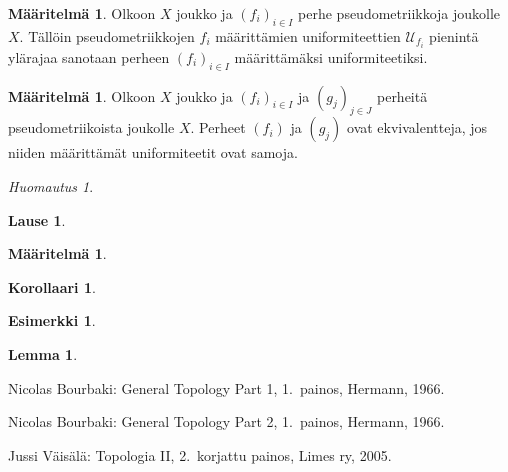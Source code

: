 \documentclass[12pt,a4paper,leqno]{report}
\newcommand{\R}{\mathbb{R}}
\newcommand{\U}{\mathcal{U}}
\theoremstyle{plain}
\newtheorem{lause}[equation]{Lause}
\newtheorem{lem}[equation]{Lemma}
\newtheorem{kor}[equation]{Korollaari}
\theoremstyle{definition}
\newtheorem{maar}[equation]{Määritelmä}
\newtheorem{esim}[equation]{Esimerkki}
\theoremstyle{remark}
\newtheorem{huom}[equation]{Huomautus}
\begin{document}
\begin{maar}
Olkoon $X$ joukko ja $(f_i)_{i\in I} $ perhe pseudometriikkoja joukolle $X$. 
Tällöin pseudometriikkojen $f_i$ määrittämien uniformiteettien $\U_{f_i}$ pienintä ylärajaa sanotaan perheen $(f_i)_{i\in I}$ määrittämäksi uniformiteetiksi. 
\end{maar}
\begin{maar}
Olkoon $X$ joukko ja $(f_i)_{i\in I} $ ja $(g_j)_{j\in J} $ perheitä pseudometriikoista joukolle $X$. 
Perheet $(f_i)$ ja $(g_j) $ ovat ekvivalentteja, jos niiden määrittämät uniformiteetit ovat samoja.
\end{maar}

\begin{huom}
\end{huom}
\begin{lause}
\end{lause}
\begin{maar}
\end{maar}
\begin{kor}
\end{kor}
\begin{esim}
\end{esim}
\begin{lem}
\end{lem}
\begin{thebibliography}{9}

Nicolas Bourbaki: General Topology Part 1, 1.\ painos, Hermann, 1966.

Nicolas Bourbaki: General Topology Part 2, 1.\ painos, Hermann, 1966.

%
%
Jussi Väisälä: Topologia II, 2.\ korjattu painos, Limes ry, 2005.



\end{thebibliography}
\end{document}
